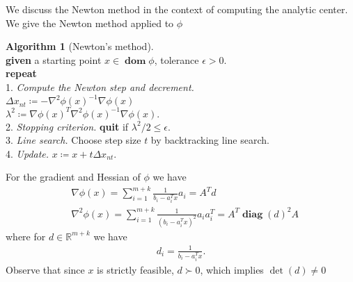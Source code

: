 \documentclass[11pt]{amsart}
\theoremstyle{definition}
\newtheorem{algorithm}{Algorithm}
\theoremstyle{remark}
\newcommand{\ind}{\hspace*{0.5cm}}
\newcommand{\transpose}{T}
\DeclareMathOperator{\domain}{\textbf{dom}}
\DeclareMathOperator{\diag}{\textbf{diag}}
\begin{document}
        We discuss the Newton method in the context of computing the analytic center. We give the Newton method applied to $\phi$
        \begin{algorithm}[Newton's method]
        \label{a:general_conceptual_cp_alg}\mbox{}\\
            \ind \textbf{given} a starting point $x \in \domain \phi$, tolerance $\epsilon > 0.$ \\
            \ind \textbf{repeat} \\
            \ind\ind 1. \emph{Compute the Newton step and decrement.} \\
            \ind\ind\ind $\Delta x_{nt} \coloneqq -\nabla^2 \phi(x)^{-1} \nabla \phi(x)$ \\
            \ind\ind\ind $\lambda^2 \coloneqq \nabla \phi(x)^\transpose \nabla^2 \phi(x)^{-1} \nabla \phi(x).$ \\
            \ind\ind 2. \emph{Stopping criterion.} \textbf{quit} if $\lambda^2/2 \leq \epsilon.$\\
            \ind\ind 3. \emph{Line search.} Choose step size $t$ by backtracking line search. \\
            \ind\ind 4. \emph{Update.} $x \coloneqq x + t\Delta x_{nt}.$ \\
        \end{algorithm} 
        For the gradient and Hessian of $\phi$ we have
        \begin{align}
            &\nabla \phi(x) = \sum_{i=1}^{m+k} \frac{1}{b_i - a_i^\transpose x}a_i = A^\transpose d \\
            &\nabla^2 \phi(x) = \sum_{i=1}^{m+k} \frac{1}{(b_i - a_i^\transpose x)^2}a_i a_i^\transpose = A^\transpose \diag(d)^2 A
        \end{align}
        where for $d \in \mathbb{R}^{m+k}$ we have
        \begin{align*}
            d_i = \frac{1}{b_i - a_i^\transpose x}.
        \end{align*}
        Observe that since $x$ is strictly feasible, $d \succ 0$, which implies $\det(d) \neq 0$ 
\renewcommand\refname{Bibliography}
\end{document}
